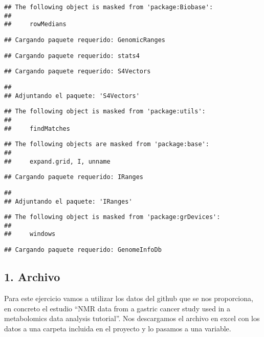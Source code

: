\documentclass[
]{article}
\begin{document}
\begin{verbatim}
## The following object is masked from 'package:Biobase':
## 
##     rowMedians
\end{verbatim}

\begin{verbatim}
## Cargando paquete requerido: GenomicRanges
\end{verbatim}

\begin{verbatim}
## Cargando paquete requerido: stats4
\end{verbatim}

\begin{verbatim}
## Cargando paquete requerido: S4Vectors
\end{verbatim}

\begin{verbatim}
## 
## Adjuntando el paquete: 'S4Vectors'
\end{verbatim}

\begin{verbatim}
## The following object is masked from 'package:utils':
## 
##     findMatches
\end{verbatim}

\begin{verbatim}
## The following objects are masked from 'package:base':
## 
##     expand.grid, I, unname
\end{verbatim}

\begin{verbatim}
## Cargando paquete requerido: IRanges
\end{verbatim}

\begin{verbatim}
## 
## Adjuntando el paquete: 'IRanges'
\end{verbatim}

\begin{verbatim}
## The following object is masked from 'package:grDevices':
## 
##     windows
\end{verbatim}

\begin{verbatim}
## Cargando paquete requerido: GenomeInfoDb
\end{verbatim}

\subsection{1. Archivo}\label{archivo}

Para este ejercicio vamos a utilizar los datos del github que se nos
proporciona, en concreto el estudio ``NMR data from a gastric cancer
study used in a metabolomics data analysis tutorial''. Nos descargamos
el archivo en excel con los datos a una carpeta incluida en el proyecto
y lo pasamos a una variable.
\end{document}
